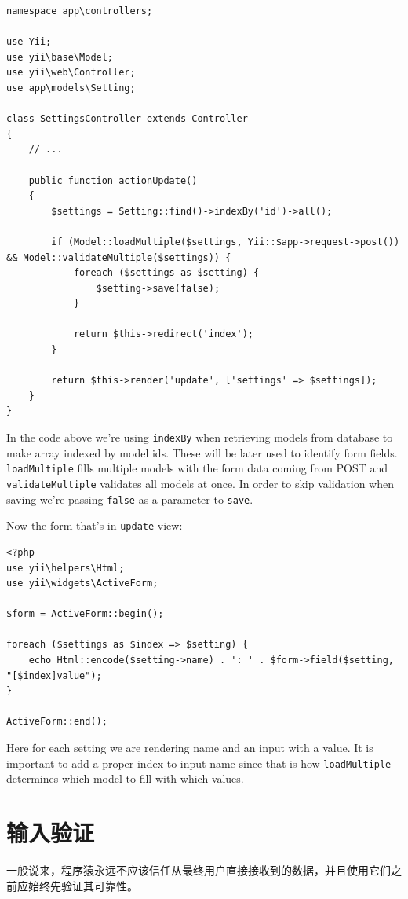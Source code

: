 \lstset{language=php}\begin{lstlisting}
namespace app\controllers;

use Yii;
use yii\base\Model;
use yii\web\Controller;
use app\models\Setting;

class SettingsController extends Controller
{
    // ...

    public function actionUpdate()
    {
        $settings = Setting::find()->indexBy('id')->all();

        if (Model::loadMultiple($settings, Yii::$app->request->post()) && Model::validateMultiple($settings)) {
            foreach ($settings as $setting) {
                $setting->save(false);
            }

            return $this->redirect('index');
        }

        return $this->render('update', ['settings' => $settings]);
    }
}
\end{lstlisting}
In the code above we're using \lstinline|indexBy| when retrieving models from database to make array indexed by model ids. These
will be later used to identify form fields. \lstinline|loadMultiple| fills multiple models with the form data coming from POST
and \lstinline|validateMultiple| validates all models at once. In order to skip validation when saving we're passing \lstinline|false| as
a parameter to \lstinline|save|.

Now the form that's in \lstinline|update| view:

\lstset{language=php}\begin{lstlisting}
<?php
use yii\helpers\Html;
use yii\widgets\ActiveForm;

$form = ActiveForm::begin();

foreach ($settings as $index => $setting) {
    echo Html::encode($setting->name) . ': ' . $form->field($setting, "[$index]value");
}

ActiveForm::end();
\end{lstlisting}
Here for each setting we are rendering name and an input with a value. It is important to add a proper index
to input name since that is how \lstinline|loadMultiple| determines which model to fill with which values.



\label{input-validation.md}\section{输入验证}
一般说来，程序猿永远不应该信任从最终用户直接接收到的数据，并且使用它们之前应始终先验证其可靠性。

